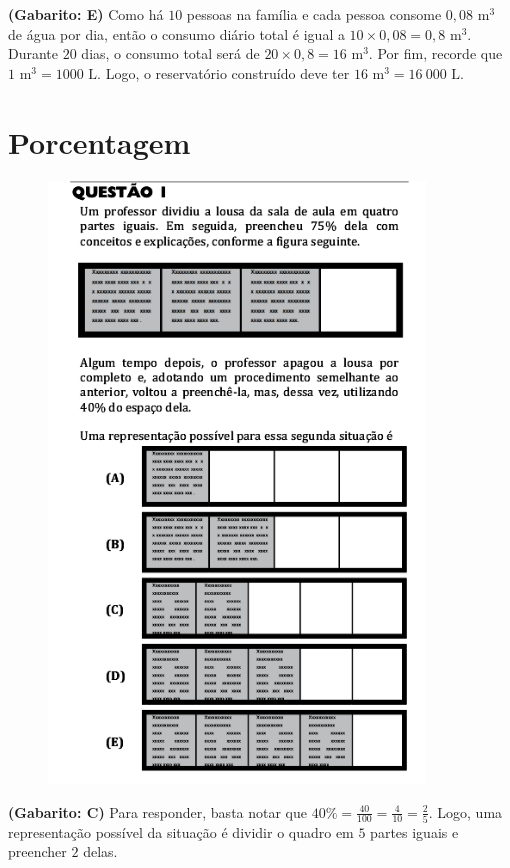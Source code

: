 \documentclass[a4paper]{article}
\begin{document}
\par\textbf{(Gabarito: E)} Como há $10$ pessoas na família e cada pessoa consome $0,08$ m$^3$ de água por dia, então o consumo diário total é igual a $10\times 0,08 = 0,8$ m$^3$. Durante $20$ dias, o consumo total será de $20\times 0,8 = 16$ m$^3$. Por fim, recorde que $1\text{ m}^3 = 1000\text{ L}$. Logo, o reservatório construído deve ter $16\text{ m}^3 = 16\ 000\text{ L}$.

\section{Porcentagem}
\begin{figure}[H]
	\begin{center}
		\includegraphics[width=10cm]{L3Q1.png}
	\end{center}
\end{figure}
\par\textbf{(Gabarito: C)} Para responder, basta notar que $\displaystyle{ 40\% = \frac{40}{100} = \frac{4}{10} = \frac{2}{5} }$. Logo, uma representação possível da situação é dividir o quadro em $5$ partes iguais e preencher $2$ delas.
\end{document}
